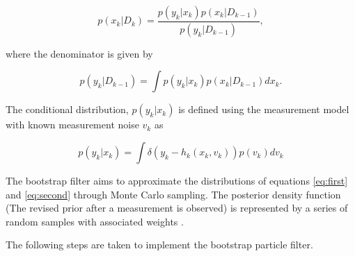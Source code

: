 \begin{equation}
p\left(x_{k} | D_{k}\right)=\frac{p\left(y_{k} | x_{k}\right) p\left(x_{k} | D_{k-1}\right)}{p\left(y_{k} | D_{k-1}\right)},
\label{eq:second}
\end{equation}

where the denominator is given by 

\begin{equation}
p\left(y_{k} | D_{k-1}\right)=\int p\left(y_{k} | x_{k}\right) p\left(x_{k} | D_{k-1}\right) d x_{k}.
\end{equation}


The conditional distribution, $p\left(y_{k} | x_{k}\right)$ is defined using the measurement model with known measurement noise $v_k$ as

\begin{equation}
p\left(y_{k} | x_{k}\right)=\int \delta\left(y_{k}-h_{k}\left(x_{k}, v_{k}\right)\right) p\left(v_{k}\right) d v_{k}
\end{equation}


The bootstrap filter aims to approximate the distributions of equations \ref{eq:first} and \ref{eq:second} through Monte Carlo sampling. The posterior density function (The revised prior after a measurement is observed)  is represented by a series of random samples with associated weights \citep{Arulampalam2002}. 

The following steps are taken to implement the bootstrap particle filter.



